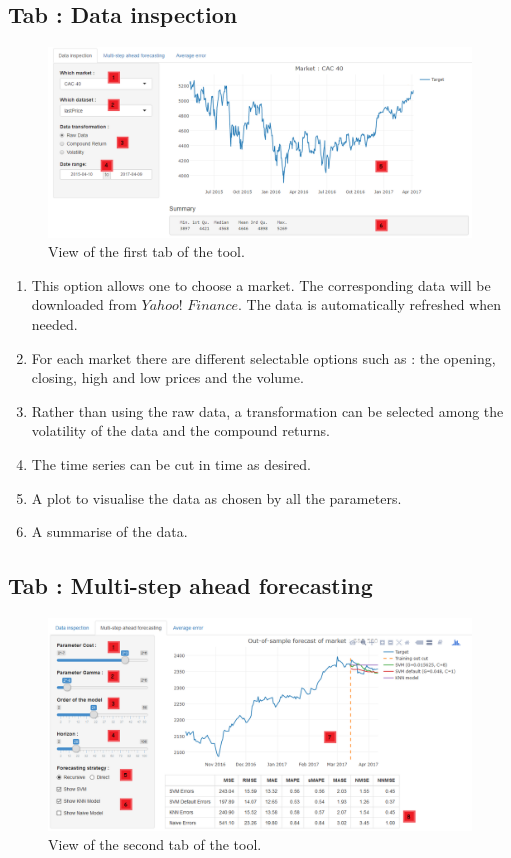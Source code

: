\documentclass[11pt,a4paper,oneside]{book}
\begin{document}
\subsection{Tab : Data inspection}


\begin{figure}[!h]
  \centering
    \includegraphics[scale=0.44]{img/tab1.png}
  \caption{View of the first tab of the tool.}
  \label{fig:tool1}
\end{figure}


\begin{enumerate}
\item This option allows one to choose a market. The corresponding data will be downloaded from $Yahoo!$ $Finance$. The data is automatically refreshed when needed.
\item For each market there are different selectable options such as : the opening, closing, high and low prices and the volume.
\item Rather than using the raw data, a transformation can be selected among the volatility of the data and the compound returns.
\item The time series can be cut in time as desired.
\item A plot to visualise the data as chosen by all the parameters.
\item A summarise of the data.
\end{enumerate}


\subsection{Tab : Multi-step ahead forecasting}

\begin{figure}[!h]
  \centering
    \includegraphics[scale=0.44]{img/tab2.png}
  \caption{View of the second tab of the tool.}
  \label{fig:tool2}
\end{figure}
\end{document}
